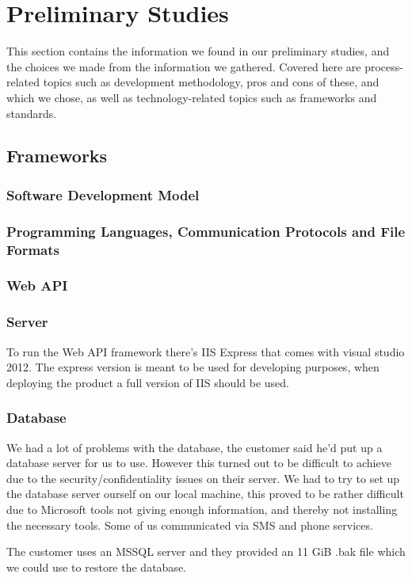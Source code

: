 \chapter{Preliminary Studies}
This section contains the information we found in our preliminary studies, and the choices we made from the information we gathered. Covered here are process-related topics such as development methodology, pros and cons of these, and which we chose, as well as technology-related topics such as frameworks and standards.


\newpage

\section{Frameworks}
\subsection{Software Development Model}
\subsection{Programming Languages, Communication Protocols and File Formats}
\subsection{Web API}
\subsection{Server}
To run the Web API framework there's IIS Express that comes with visual studio 2012. The express version is meant to be used for developing purposes, when deploying the product a full version of IIS should be used.
\subsection{Database}
We had a lot of problems with the database, the customer said he'd put up a database server for us to use. However this turned out to be difficult to achieve due to the security/confidentiality issues on their server. We had to try to set up the database server ourself on our local machine, this proved to be rather difficult due to Microsoft tools not giving enough information, and thereby not installing the necessary tools. Some of us communicated via SMS and phone services.

The customer uses an MSSQL server and they provided an 11 GiB .bak file which we could use to restore the database.

